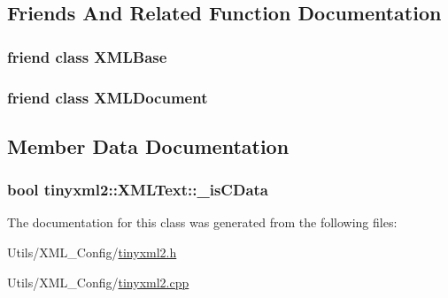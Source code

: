 \subsection{Friends And Related Function Documentation}
\hypertarget{classtinyxml2_1_1_x_m_l_text_a449202cfc89e7ae5c2f81995476f9ec1}{
\subsubsection[{X\-M\-L\-Base}]{\setlength{\rightskip}{0pt plus 5cm}friend class X\-M\-L\-Base\hspace{0.3cm}{\ttfamily [friend]}}}\label{classtinyxml2_1_1_x_m_l_text_a449202cfc89e7ae5c2f81995476f9ec1}
\hypertarget{classtinyxml2_1_1_x_m_l_text_a4eee3bda60c60a30e4e8cd4ea91c4c6e}{
\subsubsection[{X\-M\-L\-Document}]{\setlength{\rightskip}{0pt plus 5cm}friend class {\bf X\-M\-L\-Document}\hspace{0.3cm}{\ttfamily [friend]}}}\label{classtinyxml2_1_1_x_m_l_text_a4eee3bda60c60a30e4e8cd4ea91c4c6e}


\subsection{Member Data Documentation}
\hypertarget{classtinyxml2_1_1_x_m_l_text_aae1a8b4117e8c8bb107900a0560d5ab5}{
\subsubsection[{\-\_\-is\-C\-Data}]{\setlength{\rightskip}{0pt plus 5cm}bool tinyxml2\-::\-X\-M\-L\-Text\-::\-\_\-is\-C\-Data\hspace{0.3cm}{\ttfamily [private]}}}\label{classtinyxml2_1_1_x_m_l_text_aae1a8b4117e8c8bb107900a0560d5ab5}


The documentation for this class was generated from the following files\-:\begin{DoxyCompactItemize}
\item 
Utils/\-X\-M\-L\-\_\-\-Config/\hyperlink{tinyxml2_8h}{tinyxml2.\-h}\item 
Utils/\-X\-M\-L\-\_\-\-Config/\hyperlink{tinyxml2_8cpp}{tinyxml2.\-cpp}\end{DoxyCompactItemize}
